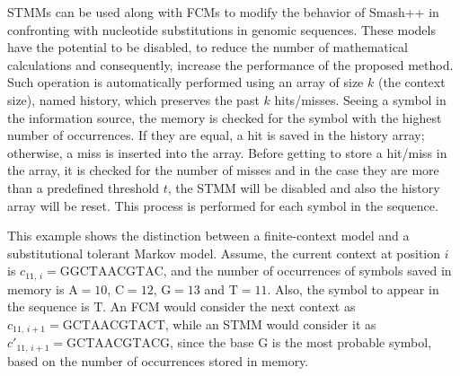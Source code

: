 \documentclass[a4paper,num-refs]{oup-contemporary}
\begin{document}
STMMs can be used along with FCMs to modify the behavior of Smash++ in confronting with nucleotide substitutions in genomic sequences. These models have the potential to be disabled, to reduce the number of mathematical calculations and consequently, increase the performance of the proposed method. Such operation is automatically performed using an array of size $k$ (the context size), named history, which preserves the past $k$ hits/misses. Seeing a symbol in the information source, the memory is checked for the symbol with the highest number of occurrences. If they are equal, a hit is saved in the history array; otherwise, a miss is inserted into the array. Before getting to store a hit/miss in the array, it is checked for the number of misses and in the case they are more than a predefined threshold $t$, the STMM will be disabled and also the history array will be reset. This process is performed for each symbol in the sequence.

This example shows the distinction between a finite-context model and a substitutional tolerant Markov model. Assume, the current context at position $i$ is $c_{11,\,i}=\textrm{GGCTAACGTAC}$, and the number of occurrences of symbols saved in memory is $\textrm{A}=10$, $\textrm{C}=12$, $\textrm{G}=13$ and $\textrm{T}=11$. Also, the symbol to appear in the sequence is $\textrm{T}$. An FCM would consider the next context as $c_{11,\,i+1}=\textrm{GCTAACGTACT}$, while an STMM would consider it as ${c'}_{11,\,i+1}=\textrm{GCTAACGTACG}$, since the base $\textrm{G}$ is the most probable symbol, based on the number of occurrences stored in memory.
\end{document}
